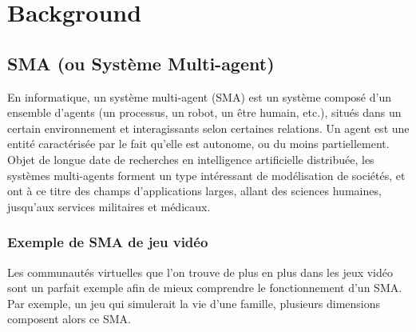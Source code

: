 
\chapter{Background} %

\label{Chapter3} %


\section{SMA (ou Système Multi-agent)}

En informatique, un système multi-agent (SMA) est un système composé d'un ensemble d'agents (un processus, un robot, un être humain, etc.), situés dans un certain environnement et interagissants selon certaines relations. Un agent est une entité caractérisée par le fait qu'elle est autonome, ou du moins partiellement.
Objet de longue date de recherches en intelligence artificielle distribuée, les systèmes multi-agents forment un type intéressant de modélisation de sociétés, et ont à ce titre des champs d'applications larges, allant des sciences humaines, jusqu’aux services militaires et médicaux. \parencite{sma}


\subsection{Exemple de SMA de jeu vidéo}

Les communautés virtuelles que l’on trouve de plus en plus dans les jeux vidéo sont un parfait exemple afin de mieux comprendre le fonctionnement d’un SMA. Par exemple, un jeu qui simulerait la vie d’une famille, plusieurs dimensions composent alors ce SMA.

